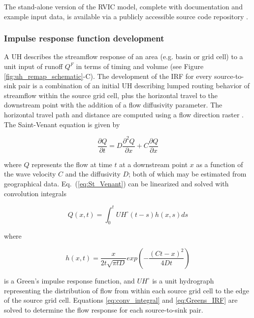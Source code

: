\documentclass[jgrga, draft]{agutex}
\begin{document}
\begin{article}
The stand-alone version of the RVIC model, complete with documentation and example input data, is available via a publicly accessible source code repository \citep{Hamman_2015}.

\subsubsection{Impulse response function development}
\label{sec:irfs}

A UH describes the streamflow response of an area (e.g. basin or grid cell) to a unit input of runoff $Q^F$ in terms of timing and volume (see Figure \ref{fig:uh_remap_schematic}-C).
The development of the IRF for every source-to-sink pair is a combination of an initial UH describing lumped routing behavior of streamflow within the source grid cell, plus the horizontal travel to the downstream point with the addition of a flow diffusivity parameter.
The horizontal travel path and distance are computed using a flow direction raster \citep[e.g.][]{Wu_2011}.
The Saint-Venant equation is given by

 \begin{equation}
   \label{eq:St_Venant}
   \frac{\partial Q}{\partial t} = D \frac{\partial^2 Q}{\partial x} + C \frac{\partial Q}{\partial x}
 \end{equation}

where $Q$ represents the flow at time $t$ at a downstream point $x$ as a function of the wave velocity $C$ and the diffusivity $D$; both of which may be estimated from geographical data.
Eq.~(\ref{eq:St_Venant}) can be linearized and solved with convolution integrals

 \begin{equation}
   \label{eq:conv_integral}
	  Q(x,t) = \int_0^t UH^{\circ}(t-s)h(x,s)ds
 \end{equation}

where

 \begin{equation}
   \label{eq:Greens_IRF}
	h(x, t) = \frac{x}{2t\sqrt{\pi tD}}exp\left(-\frac{(Ct-x)^2}{4Dt}\right)
 \end{equation}

is a Green's impulse response function, and $UH^{\circ}$ is a unit hydrograph representing the distribution of flow from within each source grid cell to the edge of the source grid cell.
Equations \ref{eq:conv_integral} and \ref{eq:Greens_IRF} are solved to determine the flow response for each source-to-sink pair.


\end{article}
\end{document}
